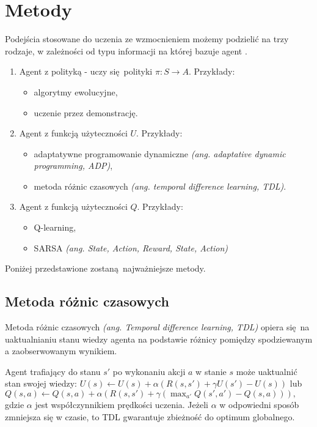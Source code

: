 \section{Metody}\label{methods}

Podejścia stosowane do uczenia ze wzmocnieniem możemy podzielić na trzy rodzaje, w zależności od typu informacji na której bazuje agent \cite{Russell:2009:AIM:1671238}.

\begin{enumerate}
\item Agent z polityką - uczy się polityki  $\pi: S \rightarrow A$. Przykłady:
\begin{itemize}
\item algorytmy ewolucyjne,
\item uczenie przez demonstrację.
\end{itemize}
\item Agent z funkcją użyteczności $U$. Przykłady:
\begin{itemize}
\item adaptatywne programowanie dynamiczne \textit{(ang. adaptative dynamic programming, ADP)},
\item metoda różnic czasowych \textit{(ang. temporal difference learning, TDL)}.
\end{itemize}
\item Agent z funkcją użyteczności $Q$. Przykłady:
\begin{itemize}
\item Q-learning,
\item SARSA \textit{(ang. State, Action, Reward, State, Action)}
\end{itemize}
\end{enumerate}

Poniżej przedstawione zostaną najważniejsze metody.

\subsection{Metoda różnic czasowych}\label{tdl}

Metoda różnic czasowych \textit{(ang. Temporal difference learning, TDL)} \cite{Sutton:1988:LPM:637912.637937} opiera się na uaktualnianiu stanu wiedzy agenta na podstawie różnicy pomiędzy spodziewanym a zaobserwowanym wynikiem.

Agent trafiający do stanu $s'$ po wykonaniu akcji $a$ w stanie $s$ może uaktualnić stan swojej wiedzy: $U(s) \leftarrow U(s) + \alpha (R(s,s') + \gamma U(s') - U (s))$ lub $Q(s,a) \leftarrow Q(s,a) + \alpha (R(s,s') + \gamma (\max_{a'}Q(s',a') - Q (s,a))),$ gdzie $\alpha$ jest współczynnikiem prędkości uczenia. Jeżeli $\alpha$ w odpowiedni sposób zmniejsza się w czasie, to TDL gwarantuje zbieżność do optimum globalnego.

